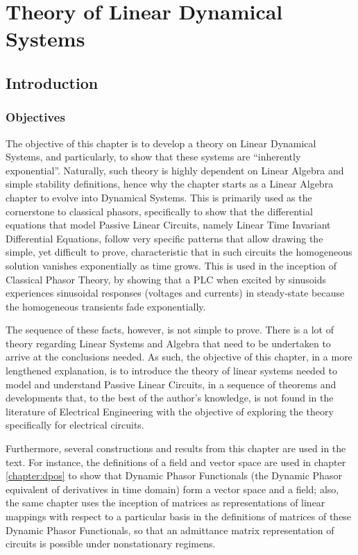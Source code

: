\chapter{Theory of Linear Dynamical Systems}\label{chapter:linear_systems}

\section{Introduction} %

\subsection{Objectives} %

	The objective of this chapter is to develop a theory on Linear Dynamical Systems, and particularly, to show that these systems are ``inherently exponential''. Naturally, such theory is highly dependent on Linear Algebra and simple stability definitions, hence why the chapter starts as a Linear Algebra chapter to evolve into Dynamical Systems. This is primarily used as the cornerstone to classical phasors, specifically to show that the differential equations that model Passive Linear Circuits, namely Linear Time Invariant Differential Equations, follow very specific patterns that allow drawing the simple, yet difficult to prove, characteristic that in such circuits the homogeneous solution vanishes exponentially as time grows. This is used in the inception of Classical Phasor Theory, by showing that a PLC when excited by sinusoids experiences sinusoidal responses (voltages and currents) in steady-state because the homogeneous transients fade exponentially.

	The sequence of these facts, however, is not simple to prove. There is a lot of theory regarding Linear Systems and Algebra that need to be undertaken to arrive at the conclusions needed. As such, the objective of this chapter, in a more lengthened explanation, is to introduce the theory of linear systems needed to model and understand Passive Linear Circuits, in a sequence of theorems and developments that, to the best of the author's knowledge, is not found in the literature of Electrical Engineering with the objective of exploring the theory specifically for electrical circuits.

	Furthermore, several constructions and results from this chapter are used in the text. For instance, the definitions of a field and vector space are used in chapter \ref{chapter:dpos} to show that Dynamic Phasor Functionals (the Dynamic Phasor equivalent of derivatives in time domain) form a vector space and a field; also, the same chapter uses the inception of matrices as representations of linear mappings with respect to a particular basis in the definitions of matrices of these Dynamic Phasor Functionals, so that an admittance matrix representation of circuits is possible under nonstationary regimens.

